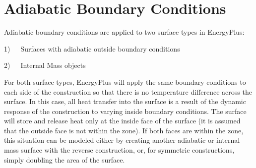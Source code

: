 \section{Adiabatic Boundary Conditions}\label{adiabatic-boundary-conditions}

Adiabatic boundary conditions are applied to two surface types in EnergyPlus:

1)~~~Surfaces with adiabatic outside boundary conditions

2)~~~Internal Mass objects

For both surface types, EnergyPlus will apply the same boundary conditions to each side of the construction so that there is no temperature difference across the surface. In this case, all heat transfer into the surface is a result of the dynamic response of the construction to varying inside boundary conditions. The surface will store and release heat only at the inside face of the surface (it is assumed that the outside face is not within the zone). If both faces are within the zone, this situation can be modeled either by creating another adiabatic or internal mass surface with the reverse construction, or, for symmetric constructions, simply doubling the area of the surface.
